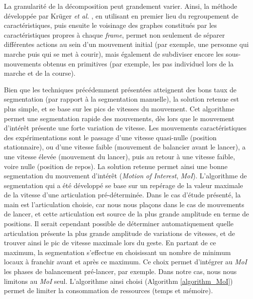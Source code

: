 La granularité de la décomposition peut grandement varier. Ainsi, la méthode développée par Krüger \textit{et al.} \parencite{Kruger2017EUT}, en utilisant en premier lieu du regroupement de caractéristiques, puis ensuite le voisinage des graphes constitués par les caractéristiques propres à chaque \textit{frame}, permet non seulement de séparer différentes actions au sein d'un mouvement initial (par exemple, une personne qui marche puis qui se met à courir), mais également de subdiviser encore les sous-mouvements obtenus en primitives (par exemple, les pas individuel lors de la marche et de la course).


Bien que les techniques précédemment présentées atteignent des bons taux de segmentation (par rapport à la segmentation manuelle), la solution retenue est plus simple, et se base sur les pics de vitesses du mouvement. Cet algorithme permet une segmentation rapide des mouvements, dès lors que le mouvement d'intérêt présente une forte variation de vitesse. Les mouvements caractéristiques des expérimentations sont le passage d'une vitesse quasi-nulle (position stationnaire), ou d'une vitesse faible (mouvement de balancier avant le lancer), a une vitesse élevée (mouvement du lancer), puis au retour à une vitesse faible, voire nulle (position de repos). La solution retenue permet ainsi une bonne segmentation du mouvement d'intérêt (\textit{Motion of Interest}, \textit{MoI}). L'algorithme de segmentation qui a été développé se base sur un repérage de la valeur maximale de la vitesse d'une articulation pré-déterminée. Dans le cas d'étude présenté, la main est l'articulation choisie, car nous nous plaçons dans le cas de mouvements de lancer, et cette articulation est source de la plus grande amplitude en terme de positions. Il serait cependant possible de déterminer automatiquement quelle articulation présente la plus grande amplitude de variations de vitesses, et de trouver ainsi le pic de vitesse maximale lors du geste. En partant de ce maximum, la segmentation s'effectue en choisissant un nombre de minimum locaux à franchir avant et après ce maximum. Ce choix permet d'intégrer au \textit{MoI} les phases de balancement pré-lancer, par exemple. Dans notre cas, nous nous limitons au \textit{MoI} seul. L'algorithme ainsi choisi (Algorithm \ref{algorithm_MoI}) permet de limiter la consommation de ressources (temps et mémoire).

